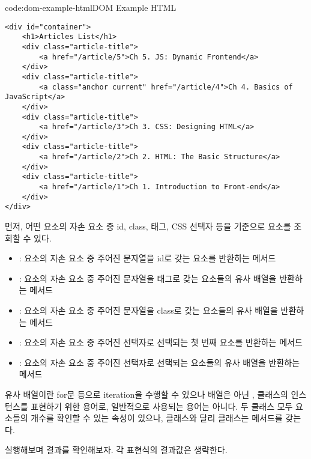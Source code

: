 \begin{codeenv}{code:dom-example-html}{DOM Example HTML}\begin{verbatim}
<div id="container">
    <h1>Articles List</h1>
    <div class="article-title">
        <a href="/article/5">Ch 5. JS: Dynamic Frontend</a>
    </div>
    <div class="article-title">
        <a class="anchor current" href="/article/4">Ch 4. Basics of JavaScript</a>
    </div>
    <div class="article-title">
        <a href="/article/3">Ch 3. CSS: Designing HTML</a>
    </div>
    <div class="article-title">
        <a href="/article/2">Ch 2. HTML: The Basic Structure</a>
    </div>
    <div class="article-title">
        <a href="/article/1">Ch 1. Introduction to Front-end</a>
    </div>
</div>
\end{verbatim}
\end{codeenv}

먼저, 어떤 요소의 자손 요소 중 id, class, 태그, CSS 선택자 등을 기준으로 요소를 조회할 수 있다.

\begin{itemize}
    \item {}: 요소의 자손 요소 중 주어진 문자열을 id로 갖는 요소를 반환하는 메서드
    \item {}: 요소의 자손 요소 중 주어진 문자열을 태그로 갖는 요소들의 유사 배열을 반환하는 메서드
    \item {}: 요소의 자손 요소 중 주어진 문자열을 class로 갖는 요소들의 유사 배열을 반환하는 메서드
    \item {}: 요소의 자손 요소 중 주어진 선택자로 선택되는 첫 번째 요소를 반환하는 메서드
    \item {}: 요소의 자손 요소 중 주어진 선택자로 선택되는 요소들의 유사 배열을 반환하는 메서드
\end{itemize}

유사 배열이란 for문 등으로 iteration을 수행할 수 있으나 배열은 아닌 ,  클래스의 인스턴스를 표현하기 위한 용어로, 일반적으로 사용되는 용어는 아니다. 두 클래스 모두 요소들의 개수를 확인할 수 있는  속성이 있으나,  클래스와 달리  클래스는  메서드를 갖는다.

\를 실행해보며 결과를 확인해보자. 각 표현식의 결과값은 생략한다.

